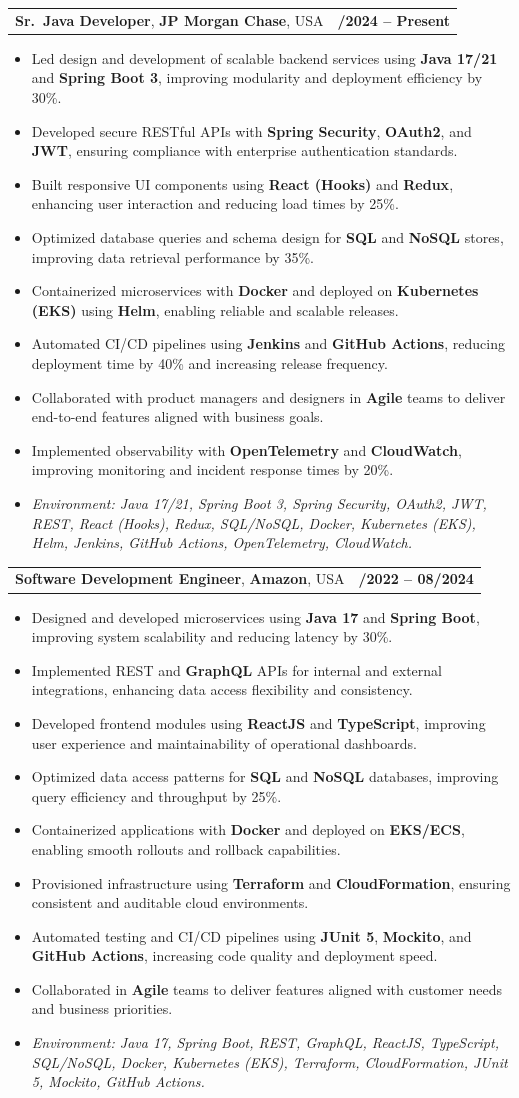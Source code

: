 \documentclass[letterpaper,11pt]{article}
\makeatletter
\newcommand{\resumeItem}[1]{
  \item\footnotesize{
    {#1 \vspace{-2pt}}
  }
}
\newcommand{\resumeSubheading}[4]{
  \vspace{-2pt}\item
    \begin{tabular*}{1.0\textwidth}[t]{l@{\extracolsep{\fill}}r}
      \textbf{\fontsize{10pt}{14pt}\selectfont #3}, \textbf{\fontsize{10pt}{14pt}\selectfont #1}, \fontsize{10pt}{14pt}\selectfont #4 & \textbf{\fontsize{10pt}{14pt}\selectfont #2} \\
    \end{tabular*}\vspace{-7pt}
}
\newcommand{\resumeItemListStart}{\begin{itemize}[leftmargin=*]}
\newcommand{\resumeItemListEnd}{\end{itemize}\vspace{-5pt}}
\makeatother
\begin{document}
\resumeSubheading
{JP Morgan Chase}{09/2024 -- Present}
{Sr.\ Java Developer}{USA}
\resumeItemListStart
  \resumeItem{Led design and development of scalable backend services using \textbf{Java 17/21} and \textbf{Spring Boot 3}, improving modularity and deployment efficiency by 30\%.}
  \resumeItem{Developed secure RESTful APIs with \textbf{Spring Security}, \textbf{OAuth2}, and \textbf{JWT}, ensuring compliance with enterprise authentication standards.}
  \resumeItem{Built responsive UI components using \textbf{React (Hooks)} and \textbf{Redux}, enhancing user interaction and reducing load times by 25\%.}
  \resumeItem{Optimized database queries and schema design for \textbf{SQL} and \textbf{NoSQL} stores, improving data retrieval performance by 35\%.}
  \resumeItem{Containerized microservices with \textbf{Docker} and deployed on \textbf{Kubernetes (EKS)} using \textbf{Helm}, enabling reliable and scalable releases.}
  \resumeItem{Automated CI/CD pipelines using \textbf{Jenkins} and \textbf{GitHub Actions}, reducing deployment time by 40\% and increasing release frequency.}
  \resumeItem{Collaborated with product managers and designers in \textbf{Agile} teams to deliver end-to-end features aligned with business goals.}
  \resumeItem{Implemented observability with \textbf{OpenTelemetry} and \textbf{CloudWatch}, improving monitoring and incident response times by 20\%.}
  \resumeItem{\textit{Environment: Java 17/21, Spring Boot 3, Spring Security, OAuth2, JWT, REST, React (Hooks), Redux, SQL/NoSQL, Docker, Kubernetes (EKS), Helm, Jenkins, GitHub Actions, OpenTelemetry, CloudWatch.}}
\resumeItemListEnd

\resumeSubheading
{Amazon}{10/2022 -- 08/2024}
{Software Development Engineer}{USA}
\resumeItemListStart
  \resumeItem{Designed and developed microservices using \textbf{Java 17} and \textbf{Spring Boot}, improving system scalability and reducing latency by 30\%.}
  \resumeItem{Implemented REST and \textbf{GraphQL} APIs for internal and external integrations, enhancing data access flexibility and consistency.}
  \resumeItem{Developed frontend modules using \textbf{ReactJS} and \textbf{TypeScript}, improving user experience and maintainability of operational dashboards.}
  \resumeItem{Optimized data access patterns for \textbf{SQL} and \textbf{NoSQL} databases, improving query efficiency and throughput by 25\%.}
  \resumeItem{Containerized applications with \textbf{Docker} and deployed on \textbf{EKS/ECS}, enabling smooth rollouts and rollback capabilities.}
  \resumeItem{Provisioned infrastructure using \textbf{Terraform} and \textbf{CloudFormation}, ensuring consistent and auditable cloud environments.}
  \resumeItem{Automated testing and CI/CD pipelines using \textbf{JUnit 5}, \textbf{Mockito}, and \textbf{GitHub Actions}, increasing code quality and deployment speed.}
  \resumeItem{Collaborated in \textbf{Agile} teams to deliver features aligned with customer needs and business priorities.}
  \resumeItem{\textit{Environment: Java 17, Spring Boot, REST, GraphQL, ReactJS, TypeScript, SQL/NoSQL, Docker, Kubernetes (EKS), Terraform, CloudFormation, JUnit 5, Mockito, GitHub Actions.}}
\resumeItemListEnd
\end{document}
